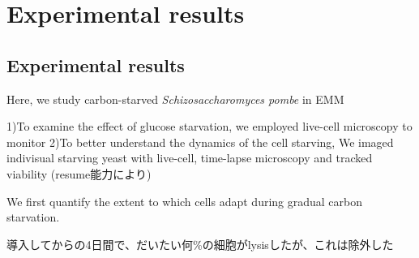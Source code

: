 \chapter{Experimental results}
\section{Experimental results}
Here, we study carbon-starved \textit{Schizosaccharomyces pombe} in EMM

1)To examine the effect of glucose starvation, we employed live-cell microscopy to monitor 
2)To better understand the dynamics of the cell starving, We imaged indivisual starving yeast with live-cell, time-lapse microscopy and tracked viability (resume能力により)

We first quantify the extent to which cells adapt during gradual carbon starvation.

導入してからの4日間で、だいたい何\%の細胞がlysisしたが、これは除外した


